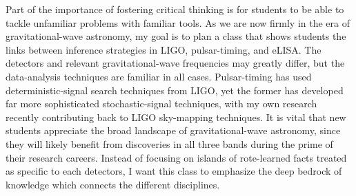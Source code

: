 \documentclass[11pt,letterpaper,sans]{moderncv} %
\begin{document}

Part of the importance of fostering critical thinking is for students to be able to tackle unfamiliar problems with familiar tools. %
As we are now firmly in the era of gravitational-wave astronomy, my goal is to plan a class that shows students the links between inference strategies in LIGO, pulsar-timing, and eLISA. The detectors and relevant gravitational-wave frequencies may greatly differ, but the data-analysis techniques are familiar in all cases. Pulsar-timing has used deterministic-signal search techniques from LIGO, yet the former has developed far more sophisticated stochastic-signal techniques, with my own research recently contributing back to LIGO sky-mapping techniques. It is vital that new students appreciate the broad landscape of gravitational-wave astronomy, since they will likely benefit from discoveries in all three bands during the prime of their research careers. Instead of focusing on islands of rote-learned facts treated as specific to each detectors, I want this class to emphasize the deep bedrock of knowledge which connects the different disciplines. 
\vspace{2mm}
\end{document}
